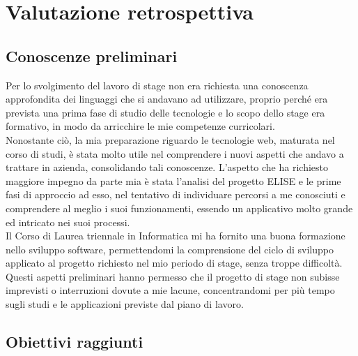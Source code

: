 
\chapter{Valutazione retrospettiva}
\label{cap:valutazione-retrospettiva}


\section{Conoscenze preliminari}

Per lo svolgimento del lavoro di stage non era richiesta una conoscenza approfondita dei linguaggi che si andavano ad utilizzare, proprio perché era prevista una prima fase di studio delle tecnologie e lo scopo dello stage era formativo, in modo da arricchire le mie competenze curricolari.\\

Nonostante ciò, la mia preparazione riguardo le tecnologie web,	maturata nel corso di studi, è stata molto utile nel comprendere i nuovi aspetti che andavo a trattare in azienda, consolidando tali conoscenze. L'aspetto che ha richiesto maggiore impegno da parte mia è stata l'analisi del progetto ELISE e le prime fasi di approccio ad esso, nel tentativo di individuare percorsi a me conosciuti e comprendere al meglio i suoi funzionamenti, essendo un applicativo molto grande ed intricato nei suoi processi.\\

Il Corso di Laurea triennale in Informatica mi ha fornito una buona formazione nello sviluppo software, permettendomi la comprensione del ciclo di sviluppo applicato al progetto richiesto nel mio periodo di stage, senza troppe difficoltà.\\
	
Questi aspetti preliminari hanno permesso che il progetto di stage non subisse imprevisti o interruzioni dovute a mie lacune, concentrandomi per più tempo sugli studi e le applicazioni previste dal piano di lavoro.

\newpage
\section{Obiettivi raggiunti}

